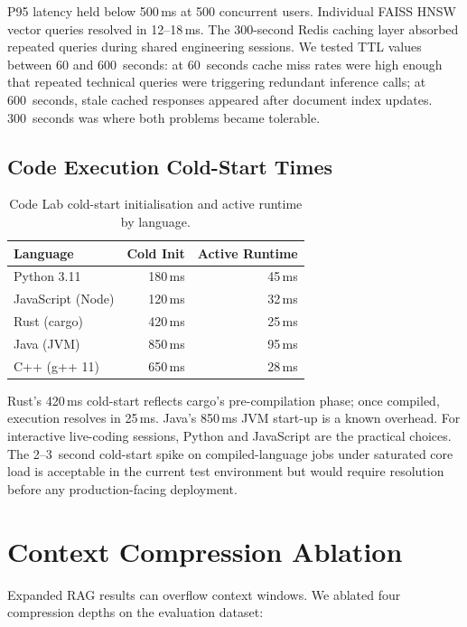 P95 latency held below 500\,ms at 500 concurrent users. Individual FAISS
HNSW vector queries resolved in 12--18\,ms. The 300-second Redis caching
layer absorbed repeated queries during shared engineering sessions. We
tested TTL values between 60 and 600~seconds: at 60~seconds cache miss
rates were high enough that repeated technical queries were triggering
redundant inference calls; at 600~seconds, stale cached responses appeared
after document index updates. 300~seconds was where both problems became
tolerable.

\subsection{Code Execution Cold-Start Times}

\begin{table}[ht]
    \centering
    \caption{Code Lab cold-start initialisation and active runtime by language.}
    \label{tab:exec}
    \begin{tabular}{lrr}
        \toprule
        \textbf{Language} & \textbf{Cold Init} & \textbf{Active Runtime} \\
        \midrule
        Python 3.11       & 180\,ms & 45\,ms \\
        JavaScript (Node) & 120\,ms & 32\,ms \\
        Rust (cargo)      & 420\,ms & 25\,ms \\
        Java (JVM)        & 850\,ms & 95\,ms \\
        C++ (g++ 11)      & 650\,ms & 28\,ms \\
        \bottomrule
    \end{tabular}
\end{table}

Rust's 420\,ms cold-start reflects cargo's pre-compilation phase; once
compiled, execution resolves in 25\,ms. Java's 850\,ms JVM start-up is a
known overhead. For interactive live-coding sessions, Python and
JavaScript are the practical choices. The 2--3~second cold-start spike on
compiled-language jobs under saturated core load is acceptable in the
current test environment but would require resolution before any
production-facing deployment.

\section{Context Compression Ablation}
\label{sec:compression-ablation}

Expanded RAG results can overflow context windows. We ablated four
compression depths on the evaluation dataset:

